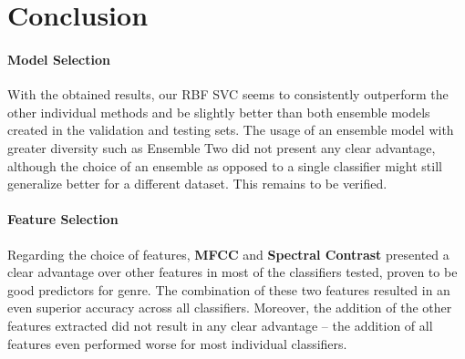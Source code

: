 \section{Conclusion}

\paragraph{Model Selection} With the obtained results, our RBF SVC seems to consistently outperform the other individual methods and be slightly better than both ensemble models created in the validation and testing sets. The usage of an ensemble model with greater diversity such as Ensemble Two did not present any clear advantage, although the choice of an ensemble as opposed to a single classifier might still generalize better for a different dataset. This remains to be verified.

\paragraph{Feature Selection} Regarding the choice of features, \textbf{MFCC} and \textbf{Spectral Contrast} presented a clear advantage over other features in most of the classifiers tested, proven to be good predictors for genre. The combination of these two features resulted in an even superior accuracy across all classifiers. Moreover, the addition of the other features extracted did not result in any clear advantage -- the addition of all features even performed worse for most individual classifiers.

